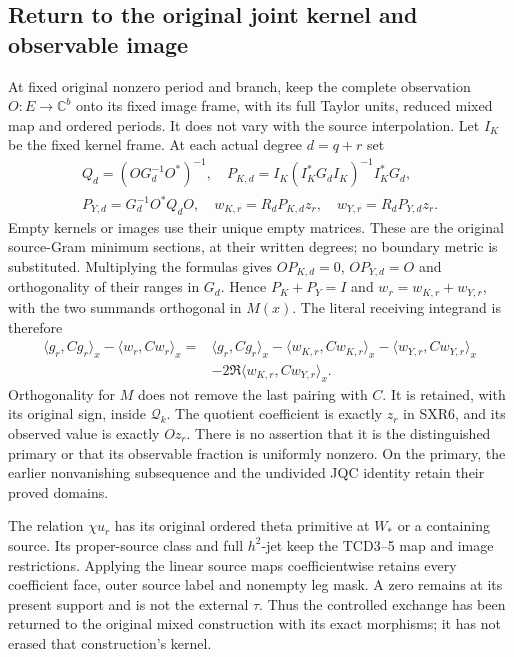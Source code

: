 \documentclass[11pt,a4paper]{article}
\begin{document}
\subsection{Return to the original joint kernel and observable image}

At fixed original nonzero period and branch, keep the complete
observation $O:E\to\mathbb C^b$ onto its fixed image frame, with
its full Taylor units, reduced mixed map and ordered periods. It
does not vary with the source interpolation. Let $I_K$ be the fixed
kernel frame. At each actual degree $d=q+r$ set
\begin{equation}\tag{SXR19}
\begin{gathered}
 Q_d=(OG_d^{-1}O^*)^{-1},\quad
 P_{K,d}=I_K(I_K^*G_dI_K)^{-1}I_K^*G_d,\\
 P_{Y,d}=G_d^{-1}O^*Q_dO,\quad
 w_{K,r}=R_dP_{K,d}z_r,\quad w_{Y,r}=R_dP_{Y,d}z_r.
\end{gathered}
\end{equation}
Empty kernels or images use their unique empty matrices. These
are the original source-Gram minimum sections, at their written
degrees; no boundary metric is substituted. Multiplying the
formulas gives $OP_{K,d}=0$, $OP_{Y,d}=O$ and orthogonality of
their ranges in $G_d$. Hence $P_K+P_Y=I$ and
$w_r=w_{K,r}+w_{Y,r}$, with the two summands orthogonal in $M(x)$.
The literal receiving integrand is therefore
\begin{equation}\tag{SXR20}
\begin{aligned}
 \langle g_r,Cg_r\rangle_x-\langle w_r,Cw_r\rangle_x
 ={}&\langle g_r,Cg_r\rangle_x
   -\langle w_{K,r},Cw_{K,r}\rangle_x
   -\langle w_{Y,r},Cw_{Y,r}\rangle_x\\
 &-2\Re\langle w_{K,r},Cw_{Y,r}\rangle_x.
\end{aligned}
\end{equation}
Orthogonality for $M$ does not remove the last pairing with $C$.
It is retained, with its original sign, inside $\mathcal Q_k$.
The quotient coefficient is exactly $z_r$ in SXR6, and its observed
value is exactly $Oz_r$. There is no assertion that it is the
distinguished primary or that its observable fraction is uniformly
nonzero. On the primary, the earlier nonvanishing subsequence and
the undivided JQC identity retain their proved domains.

The relation $\chi u_r$ has its original ordered theta primitive
at $W_*$ or a containing source. Its proper-source class and full
$h^2$-jet keep the TCD3--5 map and image restrictions. Applying the
linear source maps coefficientwise retains every coefficient face,
outer source label and nonempty leg mask. A zero remains at its
present support and is not the external $\tau$. Thus the controlled
exchange has been returned to the original mixed construction with
its exact morphisms; it has not erased that construction's kernel.
\end{document}
